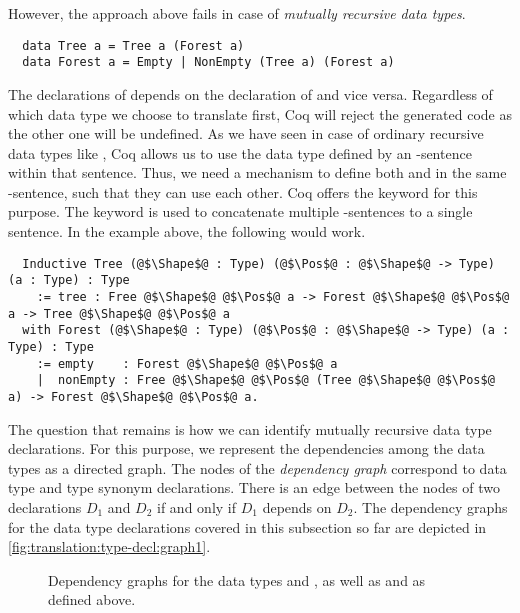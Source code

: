 However, the approach above fails in case of \textit{mutually recursive data types}.
\begin{verbatim}
  data Tree a = Tree a (Forest a)
  data Forest a = Empty | NonEmpty (Tree a) (Forest a)
\end{verbatim}
The declarations of  depends on the declaration of  and vice versa.
Regardless of which data type we choose to translate first, Coq will reject the generated code as the other one will be undefined.
As we have seen in case of ordinary recursive data types like , Coq allows us to use the data type defined by an -sentence within that sentence.
Thus, we need a mechanism to define both  and  in the same -sentence, such that they can use each other.
Coq offers the  keyword for this purpose.
The  keyword is used to concatenate multiple -sentences to a single sentence.
In the example above, the following would work.
\begin{verbatim}
  Inductive Tree (@$\Shape$@ : Type) (@$\Pos$@ : @$\Shape$@ -> Type) (a : Type) : Type
    := tree : Free @$\Shape$@ @$\Pos$@ a -> Forest @$\Shape$@ @$\Pos$@ a -> Tree @$\Shape$@ @$\Pos$@ a
  with Forest (@$\Shape$@ : Type) (@$\Pos$@ : @$\Shape$@ -> Type) (a : Type) : Type
    := empty    : Forest @$\Shape$@ @$\Pos$@ a
    |  nonEmpty : Free @$\Shape$@ @$\Pos$@ (Tree @$\Shape$@ @$\Pos$@ a) -> Forest @$\Shape$@ @$\Pos$@ a.
\end{verbatim}

The question that remains is how we can identify mutually recursive data type declarations.
For this purpose, we represent the dependencies among the data types as a directed graph.
The nodes of the \textit{dependency graph} correspond to data type and type synonym declarations.
There is an edge between the nodes of two declarations $D_1$ and $D_2$ if and only if $D_1$ depends on $D_2$.
The dependency graphs for the data type declarations covered in this subsection so far are depicted in \autoref{fig:translation:type-decl:graph1}.

\begin{figure}[H]
  \caption{Dependency graphs for the data types  and ,  as well as  and  as defined above.}
  \label{fig:translation:type-decl:graph1}
\end{figure}

